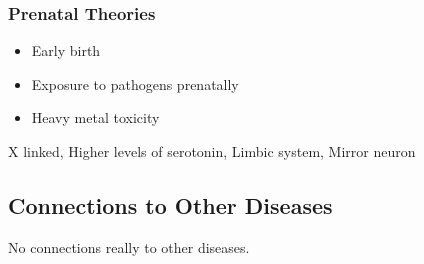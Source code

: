 \documentclass[journal, 12pt]{IEEEtran}
\begin{document}
\subsubsection{Prenatal Theories}
\begin{itemize}
\item Early birth
\item Exposure to pathogens prenatally
\item Heavy metal toxicity
\end{itemize}
\begin{IEEEkeywords}
X linked, Higher levels of serotonin, Limbic system, Mirror neuron
\end{IEEEkeywords}
\subsection{Connections to Other Diseases}
No connections really to other diseases. 
\end{document}
